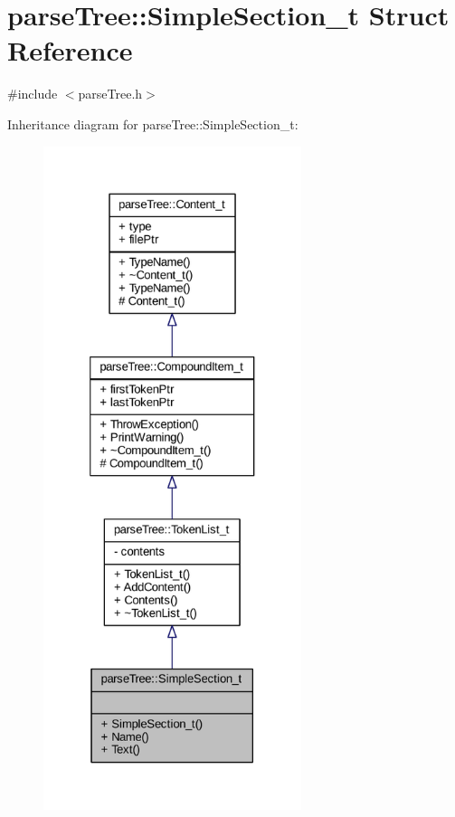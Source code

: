 \hypertarget{structparse_tree_1_1_simple_section__t}{}\section{parse\+Tree\+:\+:Simple\+Section\+\_\+t Struct Reference}
\label{structparse_tree_1_1_simple_section__t}


{\ttfamily \#include $<$parse\+Tree.\+h$>$}



Inheritance diagram for parse\+Tree\+:\+:Simple\+Section\+\_\+t\+:
\nopagebreak
\begin{figure}[H]
\begin{center}
\leavevmode
\includegraphics[height=550pt]{structparse_tree_1_1_simple_section__t__inherit__graph}
\end{center}
\end{figure}



